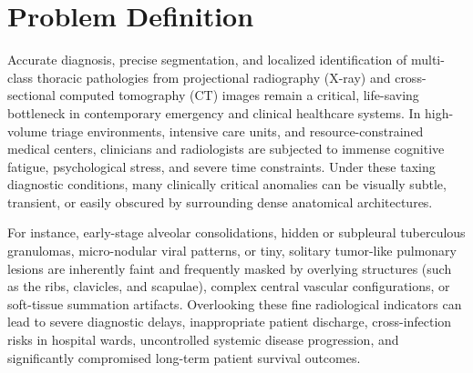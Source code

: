\section{Problem Definition}
\label{sec:problem_definition}

Accurate diagnosis, precise segmentation, and localized identification of multi-class thoracic pathologies from projectional radiography (X-ray) and cross-sectional computed tomography (CT) images remain a critical, life-saving bottleneck in contemporary emergency and clinical healthcare systems. In high-volume triage environments, intensive care units, and resource-constrained medical centers, clinicians and radiologists are subjected to immense cognitive fatigue, psychological stress, and severe time constraints. Under these taxing diagnostic conditions, many clinically critical anomalies can be visually subtle, transient, or easily obscured by surrounding dense anatomical architectures. 

For instance, early-stage alveolar consolidations, hidden or subpleural tuberculous granulomas, micro-nodular viral patterns, or tiny, solitary tumor-like pulmonary lesions are inherently faint and frequently masked by overlying  structures (such as the ribs, clavicles, and scapulae), complex central vascular configurations, or soft-tissue summation artifacts. Overlooking these fine radiological indicators can lead to severe diagnostic delays, inappropriate patient discharge, cross-infection risks in hospital wards, uncontrolled systemic disease progression, and significantly compromised long-term patient survival outcomes.

